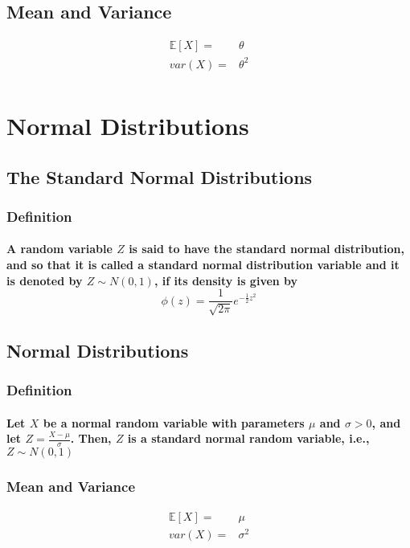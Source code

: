 \documentclass[titlepage]{article}
\begin{document}
        \subsection*{Mean and Variance}
            \begin{equation*}
                \begin{split}
                    \mathbb{E}[X]=&\theta\\
                    var(X)=&\theta^2\\
                \end{split}
            \end{equation*}
    \section{Normal Distributions}
        \subsection{The Standard Normal Distributions}
            \subsubsection*{Definition}
                \paragraph{
                    A random variable $Z$ is said to have the standard normal distribution, and so that it is called a standard normal distribution variable and it is denoted by $Z\sim N(0,1)$, if its density is given by 
                    $$\phi(z)=\frac{1}{\sqrt{2\pi}}e^{-\frac{1}{2}z^2}$$
                } 
        \subsection{Normal Distributions}
            \subsubsection*{Definition}
                \paragraph{
                    Let $X$ be a normal random variable with parameters $\mu$ and $\sigma>0$, and let $Z=\frac{X-\mu}{\sigma}$. Then, $Z$ is a standard normal random variable, i.e., $Z\sim N(0,1)$
                }
            \subsubsection*{Mean and Variance}
                \begin{equation*}
                    \begin{split}
                        \mathbb{E}[X]=&\mu\\
                        var(X)=&\sigma^2\\
                    \end{split}
                \end{equation*}
\end{document}

